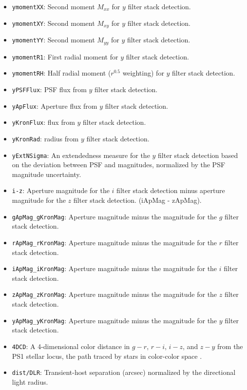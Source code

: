 \documentclass[twocolumn]{aastex63}
\begin{document}
\begin{itemize}
    \item \texttt{ymomentXX}: Second moment $M_{xx}$ for $y$ filter stack detection. 
    \item \texttt{ymomentXY}: Second moment $M_{xy}$ for $y$ filter stack detection. 
    \item \texttt{ymomentYY}: Second moment $M_{yy}$ for $y$ filter stack detection. 
    \item \texttt{ymomentR1}: First radial moment for $y$ filter stack detection.
    \item \texttt{ymomentRH}: Half radial moment ($r^{0.5}$ weighting) for $y$ filter stack detection.
    \item \texttt{yPSFFlux}: PSF flux from $y$ filter stack detection.
    \item \texttt{yApFlux}: Aperture flux from $y$ filter stack detection.
    \item \texttt{yKronFlux}: \cite{Kron1980} flux from $y$ filter stack detection.
    \item \texttt{yKronRad}: \cite{Kron1980} radius from $y$ filter stack detection.
    \item \texttt{yExtNSigma}: An extendedness measure for the $y$ filter stack detection based on the deviation between PSF and \cite{Kron1980} magnitudes, normalized by the PSF magnitude uncertainty.
    \item \texttt{i-z}: Aperture magnitude for the $i$ filter stack detection minus aperture magnitude for the $z$ filter stack detection. (iApMag - zApMag).
    \item \texttt{gApMag\_gKronMag}: Aperture magnitude minus the \cite{Kron1980} magnitude for the $g$ filter stack detection.
    \item \texttt{rApMag\_rKronMag}: Aperture magnitude minus the \cite{Kron1980} magnitude for the $r$ filter stack detection.
    \item \texttt{iApMag\_iKronMag}: Aperture magnitude minus the \cite{Kron1980} magnitude for the $i$ filter stack detection.
    \item \texttt{zApMag\_zKronMag}: Aperture magnitude minus the \cite{Kron1980} magnitude for the $z$ filter stack detection.
    \item \texttt{yApMag\_yKronMag}: Aperture magnitude minus the \cite{Kron1980} magnitude for the $y$ filter stack detection.
    \item \texttt{4DCD}: A 4-dimensional color distance in $g-r$, $r-i$, $i-z$, and $z-y$ from the PS1 stellar locus, the path traced by stars in color-color space \citep{Tonry2012}.
    \item \texttt{dist/DLR}: Transient-host separation (arcsec) normalized by the directional light radius.  
\end{itemize}
 
\end{document}
